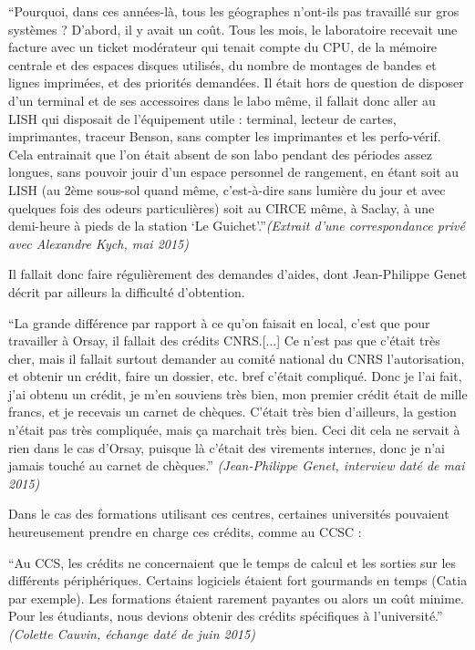 \enquote{Pourquoi, dans ces années-là, tous les géographes n'ont-ils pas travaillé sur gros systèmes ? D'abord, il y avait un coût. Tous les mois, le laboratoire recevait une facture avec un ticket modérateur qui tenait compte du CPU, de la mémoire centrale et des espaces disques utilisés, du nombre de montages de bandes et lignes imprimées, et des priorités demandées. Il était hors de question de disposer d'un terminal et de ses accessoires dans le labo même, il fallait donc aller au LISH qui disposait de l'équipement utile : terminal, lecteur de cartes, imprimantes, traceur Benson, sans compter les imprimantes et les perfo-vérif. Cela entrainait que l'on était absent de son labo pendant des périodes assez longues, sans pouvoir jouir d'un espace personnel de rangement, en étant soit au LISH (au 2ème sous-sol quand même, c'est-à-dire sans lumière du jour et avec quelques fois des odeurs particulières) soit au CIRCE même, à Saclay, à une demi-heure à pieds de la station \enquote{Le Guichet}.}\textit{(Extrait d'une correspondance privé avec Alexandre Kych, mai 2015)}

Il fallait donc faire régulièrement des demandes d'aides, dont Jean-Philippe Genet décrit par ailleurs la difficulté d'obtention.

\enquote{La grande différence par rapport à ce qu'on faisait en local, c'est que pour travailler à Orsay, il fallait des crédits CNRS.[...] Ce n’est pas que c'était très cher, mais il fallait surtout demander au comité national du CNRS l'autorisation, et obtenir un crédit, faire un dossier, etc. bref c'était compliqué. Donc je l'ai fait, j'ai obtenu un crédit, je m'en souviens très bien, mon premier crédit était de mille francs, et je recevais un carnet de chèques. C'était très bien d'ailleurs, la gestion n'était pas très compliquée, mais ça marchait très bien. Ceci dit cela ne servait à rien dans le cas d'Orsay, puisque là c'était des virements internes, donc je n’ai jamais touché au carnet de chèques.} \textit{(Jean-Philippe Genet, interview daté de mai 2015)}

Dans le cas des formations utilisant ces centres, certaines universités pouvaient heureusement prendre en charge ces crédits, comme au CCSC :

\enquote{Au CCS, les crédits ne concernaient que le temps de calcul et les sorties sur les différents périphériques. Certains logiciels étaient fort gourmands en temps (Catia par exemple). Les formations étaient rarement payantes ou alors un coût minime. Pour les étudiants, nous devions obtenir des crédits spécifiques à l’université.} \textit{(Colette Cauvin, échange daté de juin  2015)}

